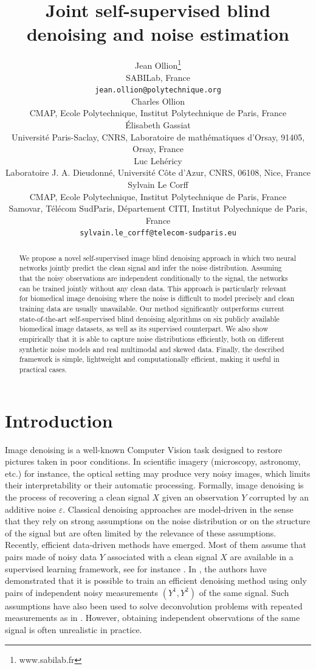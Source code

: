 \documentclass{article}
\title{Joint self-supervised blind denoising and noise estimation}
\author{%
  Jean Ollion\thanks{www.sabilab.fr}\\
  SABILab, France\\
  \texttt{jean.ollion@polytechnique.org} \\
  \And
  Charles Ollion\\
  CMAP, Ecole Polytechnique, Institut Polytechnique de Paris, France\\
  \And
  \'Elisabeth Gassiat\\
  Universit\'e Paris-Saclay, CNRS, Laboratoire de math\'ematiques d'Orsay, 91405, Orsay, France\\
  \And
  Luc Leh\'ericy\\
  Laboratoire J. A. Dieudonn\'e, Universit\'e C\^ote d'Azur, CNRS, 06108, Nice, France\\
  \And
  Sylvain Le Corff \\
  CMAP, Ecole Polytechnique, Institut Polytechnique de Paris, France\\
  Samovar, T\'el\'ecom SudParis, D\'epartement CITI, Institut Polyechnique de Paris, France\\
  \texttt{sylvain.le_corff@telecom-sudparis.eu} \\
}
\begin{document}
\maketitle

\begin{abstract}
We propose a novel self-supervised image blind denoising approach in which two neural networks jointly predict the clean signal and infer the noise distribution.
Assuming that the noisy observations are independent conditionally to the signal, the networks can be trained jointly without any clean data. This approach is particularly relevant for biomedical image denoising where the noise is difficult to model precisely and clean training data are usually unavailable. Our method significantly outperforms current state-of-the-art self-supervised blind denoising algorithms on six publicly available biomedical image datasets, as well as its supervised counterpart. We also show empirically that it is able to capture noise distributions efficiently, both on different synthetic noise models and real multimodal and skewed data.
Finally, the described framework is simple, lightweight and computationally efficient, making it useful in practical cases.
\end{abstract}

\section{Introduction}
\label{sec:introduction}

Image denoising is a well-known Computer Vision task designed to restore pictures taken in poor conditions. In scientific imagery (microscopy, astronomy, etc.) for instance,  the optical setting may produce very noisy images, which limits their interpretability or their automatic processing.
Formally, image denoising is the process of recovering a clean signal $X$ given an observation $Y$ corrupted by an additive noise $\varepsilon$. Classical denoising approaches are model-driven in the sense that they rely on strong assumptions on the noise distribution or on the structure of the signal but are often limited by the relevance of these assumptions.
Recently, efficient data-driven methods have emerged. Most of them assume that pairs made of noisy data $Y$ associated with a clean signal $X$ are available in a supervised learning framework, see for instance \cite{weigert2017content}. In \cite{lehtinen2018noise2noise}, the authors have demonstrated that it is possible to train an efficient denoising method using only pairs of independent noisy measurements $(Y^1, Y^2)$ of the same signal. Such assumptions have also been used to solve deconvolution problems with repeated measurements as in \cite{delaigle2008deconvolution}. However, obtaining independent observations of the same signal is often unrealistic in practice.
\end{document}
